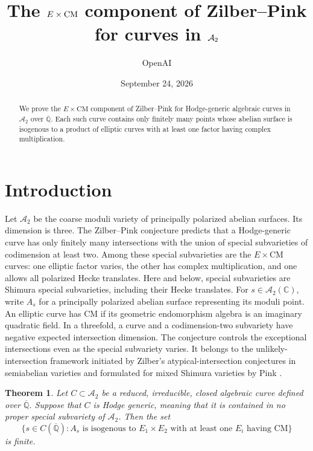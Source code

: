 \documentclass[11pt,a4paper]{article}
\title{The \(E\times\CM\) component of Zilber--Pink\\
for curves in \(\A_2\)}
\author{OpenAI}
\date{September 24, 2026}
\numberwithin{equation}{section}
\newtheorem{theorem}{Theorem}[section]
\theoremstyle{definition}
\theoremstyle{remark}
\newcommand{\A}{\mathcal A}
\newcommand{\C}{\mathbb C}
\newcommand{\Qbar}{\overline{\mathbb Q}}
\newcommand{\CM}{\mathrm{CM}}
\begin{document}
\maketitle

\begin{abstract}
We prove the \(E\times\CM\) component of Zilber--Pink for Hodge-generic
algebraic curves in \(\A_2\) over \(\Qbar\). Each such curve contains only
finitely many points whose abelian surface is isogenous to a product of
elliptic curves with at least one factor having complex multiplication.
\end{abstract}

\section{Introduction}

Let \(\A_2\) be the coarse moduli variety of principally polarized abelian
surfaces. Its dimension is three. The Zilber--Pink conjecture predicts
that a Hodge-generic curve has only finitely many intersections with the
union of special subvarieties of codimension at least two. Among these
special subvarieties are the \(E\times\CM\) curves: one elliptic factor
varies, the other has complex multiplication, and one allows all
polarized Hecke translates. Here and below, special subvarieties are
Shimura special subvarieties, including their Hecke translates.
For \(s\in\A_2(\C)\), write \(A_s\) for a principally polarized
abelian surface representing its moduli point. An elliptic curve
has CM if its geometric endomorphism algebra is an imaginary
quadratic field.
In a threefold, a curve and a codimension-two subvariety have
negative expected intersection dimension. The conjecture controls
the exceptional intersections even as the special subvariety varies.
It belongs to the unlikely-intersection framework initiated by
Zilber's atypical-intersection conjectures in semiabelian varieties
\cite{Zilber} and formulated for mixed Shimura varieties by Pink
\cite[Conjecture~1.3]{Pink}.

\begin{theorem}\label{thm:main}
Let \(C\subset\A_2\) be a reduced, irreducible, closed algebraic curve
defined over \(\Qbar\). Suppose that \(C\) is Hodge generic, meaning that
it is contained in no proper special subvariety of \(\A_2\).
Then the set
\[
 \bigl\{s\in C(\Qbar):
 A_s\text{ is isogenous to }E_1\times E_2
 \text{ with at least one }E_i\text{ having CM}\bigr\}
\]
is finite.
\end{theorem}
\end{document}
